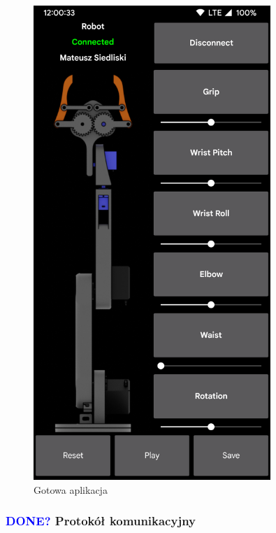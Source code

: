 \documentclass[11pt,titlepage,a4paper]{article}
\begin{document}
\begin{figure}[p]
    \begin{center}
        \includegraphics[width=0.8\textwidth]{img/app.png}
    \end{center}
    \caption{Gotowa aplikacja}
    \label{FinalApp}
\end{figure}

\subsubsection{\textcolor{blue}{DONE?} Protokół komunikacyjny}
\end{document}
